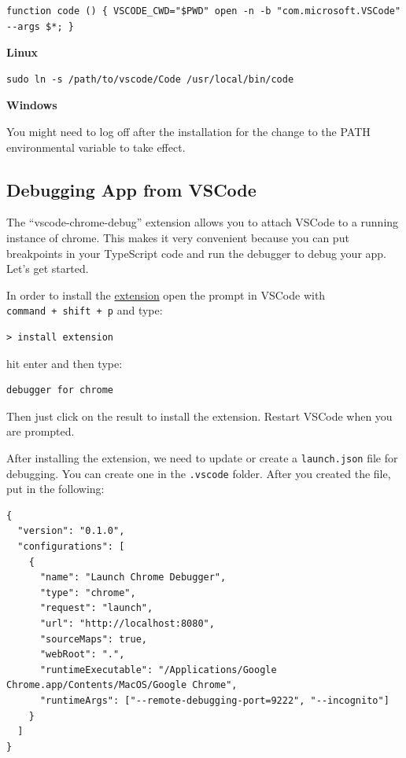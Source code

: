 \documentclass[12pt,]{article}
\begin{document}
\begin{verbatim}
function code () { VSCODE_CWD="$PWD" open -n -b "com.microsoft.VSCode" --args $*; }
\end{verbatim}

\textbf{Linux}

\begin{verbatim}
sudo ln -s /path/to/vscode/Code /usr/local/bin/code
\end{verbatim}

\textbf{Windows}

You might need to log off after the installation for the change to the
PATH environmental variable to take effect.

\subsection{Debugging App from VSCode}\label{debugging-app-from-vscode}

The ``vscode-chrome-debug'' extension allows you to attach VSCode to a
running instance of chrome. This makes it very convenient because you
can put breakpoints in your TypeScript code and run the debugger to
debug your app. Let's get started.

In order to install the
\href{https://github.com/Microsoft/vscode-chrome-debug}{extension} open
the prompt in VSCode with \texttt{command\ +\ shift\ +\ p} and type:

\begin{verbatim}
> install extension
\end{verbatim}

hit enter and then type:

\begin{verbatim}
debugger for chrome
\end{verbatim}

Then just click on the result to install the extension. Restart VSCode
when you are prompted.

After installing the extension, we need to update or create a
\texttt{launch.json} file for debugging. You can create one in the
\texttt{.vscode} folder. After you created the file, put in the
following:

\begin{verbatim}
{
  "version": "0.1.0",
  "configurations": [
    {
      "name": "Launch Chrome Debugger",
      "type": "chrome",
      "request": "launch",
      "url": "http://localhost:8080",
      "sourceMaps": true,
      "webRoot": ".",
      "runtimeExecutable": "/Applications/Google Chrome.app/Contents/MacOS/Google Chrome",
      "runtimeArgs": ["--remote-debugging-port=9222", "--incognito"]
    }
  ]
}
\end{verbatim}
\end{document}
